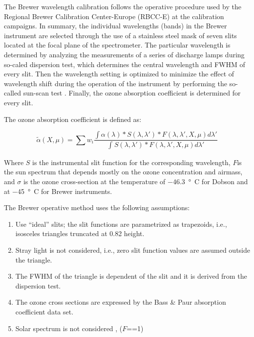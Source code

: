 \documentclass[acp, manuscript]{copernicus}
\begin{document}

The Brewer wavelength calibration follows the operative procedure \citep{Grobner1998, kerr2002new} used by the Regional Brewer Calibration Center-Europe (RBCC-E) at the calibration campaigns. In summary, the individual wavelengths (bands) in the Brewer instrument are selected through the use of a stainless steel mask of seven slits located at the focal plane of the spectrometer. The particular wavelength is determined by analyzing the measurements of  a series of discharge lamps during so-caled dispersion test, which determines the central wavelength and FWHM of every slit. Then the  wavelength setting is optimized to minimize the effect of wavelength shift during the operation of the instrument by performing the so-called sun-scan test \citep{sun_scan_ios}. Finally, the ozone absorption coefficient is determined for every slit.   


The  ozone absorption coefficient is defined as:

\begin{equation}
\widetilde \alpha (X,\mu ) = \sum {{w_i}} \frac{{\int {\alpha (\lambda )*S(\lambda ,\lambda ')*} F(\lambda ,\lambda ',X,\mu )d\lambda '}}{{\int_{}^{} {S(\lambda ,\lambda ')*F(\lambda ,\lambda ',X,\mu )d\lambda '} }}
\end{equation}

Where $S$ is the instrumental slit function for the corresponding wavelength, $F$is the sun spectrum that depends mostly on the ozone concentration and airmass, and $\sigma$ is the ozone cross-section at the temperature of $-$46.3\, \unit{\degree C} for Dobson 
and at $-$45\, \unit{\degree C} for Brewer instruments. 

The Brewer operative method uses the following assumptions:
\begin{enumerate}
	\item Use  “ideal” slits; the slit functions are parametrized as trapezoids, i.e., isosceles triangles truncated at 0.82 height.
	\item Stray light is not considered, i.e., zero slit function values are assumed outside the triangle. 
	\item The FWHM of the triangle is dependent of the slit and it is derived from the dispersion test.
	\item The ozone cross sections are expressed by the Bass \& Paur absorption coefficient data set.
 	\item Solar spectrum is not considered ,  ($F$==1)
\end{enumerate}
\end{document}

